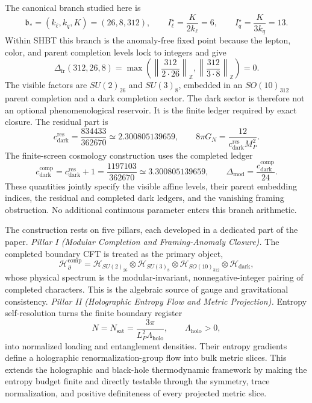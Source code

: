 \documentclass[11pt,letterpaper]{article}
\theoremstyle{plain}
\newcommand{\branchstar}{\mathfrak b_*}
\newcommand{\kell}{k_{\ell}}
\newcommand{\kq}{k_q}
\newcommand{\Kpar}{K}
\newcommand{\Deltafr}{\Delta_{\text{fr}}}
\newcommand{\cdarkres}{c_{\text{dark}}^{\text{res}}}
\newcommand{\Lholo}{\Lambda_{\text{holo}}}
\newcommand{\Nsat}{N_{\text{sat}}}
\newcommand{\Nbits}{N}
\newcommand{\Lp}{L_P}
\newcommand{\MP}{M_P}
\newcommand{\GN}{G_N}
\newcommand{\DeltaMod}{\Delta_{\text{mod}}}
\begin{document}
The canonical branch studied here is
\begin{equation}
 \branchstar=(\kell,\kq,\Kpar)=(26,8,312),
 \qquad
 I_{\ell}^{\star}=\frac{\Kpar}{2\kell}=6,
 \qquad
 I_q^{\star}=\frac{\Kpar}{3\kq}=13.
\end{equation}
Within SHBT this branch is the anomaly-free fixed point because the lepton,
color, and parent completion levels lock to integers and give
\begin{equation}
 \Deltafr(312,26,8)
 =
 \max\!\left(
 \left\|\frac{312}{2\cdot26}\right\|_{\mathbb Z},
 \left\|\frac{312}{3\cdot8}\right\|_{\mathbb Z}
 \right)
 =0.
\end{equation}
The visible factors are $SU(2)_{26}$ and $SU(3)_8$, embedded in an
$SO(10)_{312}$ parent completion and a dark completion sector.  The dark sector
is therefore not an optional phenomenological reservoir.  It is the finite
ledger required by exact closure.  The residual part is
\begin{equation}
 \cdarkres=\frac{834433}{362670}\simeq2.300805139659,
 \qquad
 8\pi\GN=\frac{12}{\cdarkres\MP^2}.
\end{equation}
The finite-screen cosmology construction uses the completed ledger
\begin{equation}
\label{eq:dark-residual-completion-split}
 c_{\text{dark}}^{\text{comp}}
 =c_{\text{dark}}^{\text{res}}+1
 =
 \frac{1197103}{362670}
 \simeq3.300805139659,
 \qquad
 \DeltaMod=\frac{c_{\text{dark}}^{\text{comp}}}{24}.
\end{equation}
These quantities jointly specify the visible affine levels, their parent
embedding indices, the residual and completed dark ledgers, and the vanishing
framing obstruction.  No additional continuous parameter enters this branch
arithmetic.

The construction rests on five pillars, each developed in a dedicated part of
the paper.
\emph{Pillar I (Modular Completion and Framing-Anomaly Closure).}  The
completed boundary CFT is treated as the primary object,
\begin{equation}
 \mathcal H_{\partial}^{\text{comp}}
 =
 \mathcal H_{SU(2)_{26}}
 \otimes
 \mathcal H_{SU(3)_8}
 \otimes
 \mathcal H_{SO(10)_{312}}
 \otimes
 \mathcal H_{\text{dark}},
\end{equation}
whose physical spectrum is the modular-invariant, nonnegative-integer pairing
of completed characters.  This is the algebraic source of gauge and
gravitational consistency.
\emph{Pillar II (Holographic Entropy Flow and Metric Projection).}  Entropy
self-resolution turns the finite
boundary register
\begin{equation}
 \Nbits=\Nsat=\frac{3\pi}{\Lp^2\Lholo},
 \qquad
 \Lholo>0,
\end{equation}
into normalized loading and entanglement densities.  Their entropy gradients
define a holographic renormalization-group flow into bulk metric slices.  This
extends the holographic and black-hole thermodynamic framework
\cite{bekenstein1973,susskind1995} by making the entropy budget
finite and directly testable through the symmetry, trace normalization, and
positive definiteness of every projected metric slice.
\end{document}
